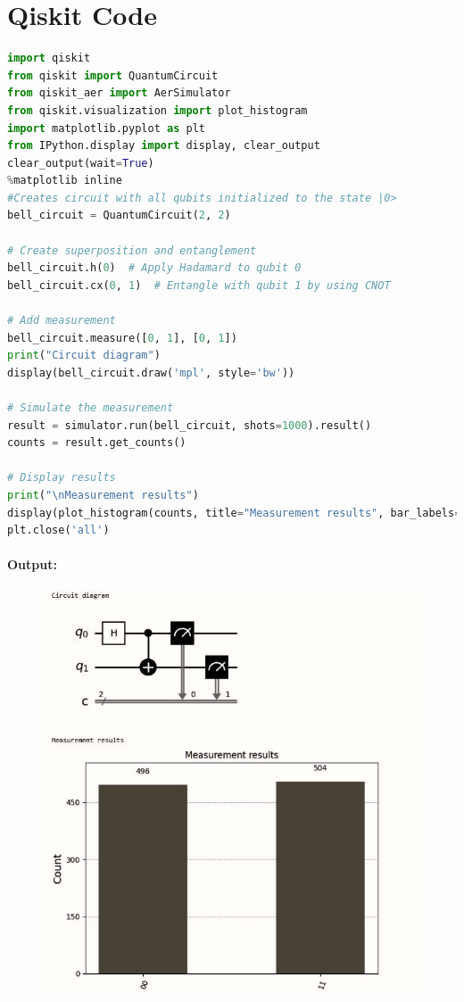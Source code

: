\chapter{Qiskit Code}
\label{appendix:B}

\begin{lstlisting}[language=Python, caption={Forming the Bell state $|\Phi^+\rangle = \frac{1}{\sqrt{2}} (|00\rangle + |11\rangle)$}]
import qiskit
from qiskit import QuantumCircuit
from qiskit_aer import AerSimulator
from qiskit.visualization import plot_histogram
import matplotlib.pyplot as plt 
from IPython.display import display, clear_output
clear_output(wait=True)
%matplotlib inline
#Creates circuit with all qubits initialized to the state |0>
bell_circuit = QuantumCircuit(2, 2)

# Create superposition and entanglement
bell_circuit.h(0)  # Apply Hadamard to qubit 0
bell_circuit.cx(0, 1)  # Entangle with qubit 1 by using CNOT

# Add measurement
bell_circuit.measure([0, 1], [0, 1])
print("Circuit diagram")
display(bell_circuit.draw('mpl', style='bw'))

# Simulate the measurement
result = simulator.run(bell_circuit, shots=1000).result()
counts = result.get_counts()

# Display results
print("\nMeasurement results")
display(plot_histogram(counts, title="Measurement results", bar_labels=True))
plt.close('all')
\end{lstlisting}


\subsubsection{Output:}
\begin{figure}[H]
    \centering
    \includegraphics[width=1.1\textwidth]{Bell-state-output.png}
    \label{fig:output1}
\end{figure}
\newpage


